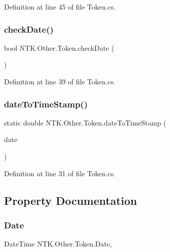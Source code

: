 Definition at line 45 of file Token.\+cs.

\mbox{\label{class_n_t_k_1_1_other_1_1_token_a209735bea798d60032147504b0361e8f}} 
\subsubsection{\texorpdfstring{checkDate()}{checkDate()}}
{\footnotesize\ttfamily bool N\+T\+K.\+Other.\+Token.\+check\+Date (\begin{DoxyParamCaption}{ }\end{DoxyParamCaption})}



Definition at line 39 of file Token.\+cs.

\mbox{\label{class_n_t_k_1_1_other_1_1_token_aa16a2c81ecf086b9894f877eb670cd11}} 
\subsubsection{\texorpdfstring{dateToTimeStamp()}{dateToTimeStamp()}}
{\footnotesize\ttfamily static double N\+T\+K.\+Other.\+Token.\+date\+To\+Time\+Stamp (\begin{DoxyParamCaption}\item[{Date\+Time}]{date }\end{DoxyParamCaption})\hspace{0.3cm}{\ttfamily [static]}}



Definition at line 31 of file Token.\+cs.



\subsection{Property Documentation}
\mbox{\label{class_n_t_k_1_1_other_1_1_token_a817bb53bf41d954b5d6a289caa304816}} 
\subsubsection{\texorpdfstring{Date}{Date}}
{\footnotesize\ttfamily Date\+Time N\+T\+K.\+Other.\+Token.\+Date\hspace{0.3cm}{\ttfamily [get]}, {\ttfamily [set]}}



